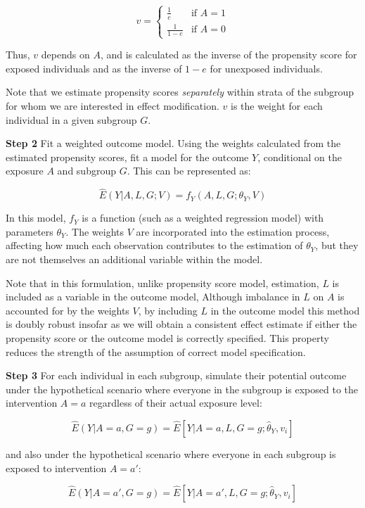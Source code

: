 \documentclass[
  singlecolumn]{article}
\begin{document}
\[
v = 
\begin{cases} 
\frac{1}{e} & \text{if } A = 1 \\
\frac{1}{1-e} & \text{if } A = 0 
\end{cases}
\]

Thus, \(v\) depends on \(A\), and is calculated as the inverse of the
propensity score for exposed individuals and as the inverse of \(1-e\)
for unexposed individuals.

Note that we estimate propensity scores \emph{separately} within strata
of the subgroup for whom we are interested in effect modification. \(v\)
is the weight for each individual in a given subgroup \(G\).

\textbf{Step 2} Fit a weighted outcome model. Using the weights
calculated from the estimated propensity scores, fit a model for the
outcome \(Y\), conditional on the exposure \(A\) and subgroup \(G\).
This can be represented as:

\[ \hat{E}(Y|A, L, G; V) = f_Y(A, L, G ; \theta_Y, V) \]

In this model, \(f_Y\) is a function (such as a weighted regression
model) with parameters \(θ_Y\). The weights \(V\) are incorporated into
the estimation process, affecting how much each observation contributes
to the estimation of \(θ_Y\), but they are not themselves an additional
variable within the model.

Note that in this formulation, unlike propensity score model,
estimation, \(L\) is included as a variable in the outcome model,
Although imbalance in \(L\) on \(A\) is accounted for by the weights
\(V\), by including \(L\) in the outcome model this method is doubly
robust insofar as we will obtain a consistent effect estimate if either
the propensity score or the outcome model is correctly specified. This
property reduces the strength of the assumption of correct model
specification.

\textbf{Step 3} For each individual in each subgroup, simulate their
potential outcome under the hypothetical scenario where everyone in the
subgroup is exposed to the intervention \(A=a\) regardless of their
actual exposure level:

\[\hat{E}(Y|A=a, G=g)  = \hat{E}[Y|A=a,L,G=g; \hat{\theta}_Y,  v_i]\]

and also under the hypothetical scenario where everyone in each subgroup
is exposed to intervention \(A=a'\):

\[\hat{E}(Y|A=a', G=g)  = \hat{E}[Y|A=a',L,G=g; \hat{\theta}_Y,  v_i]\]
\end{document}
